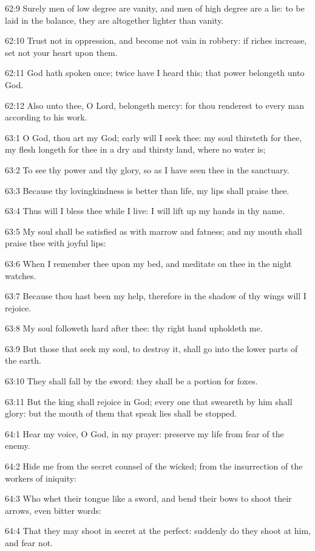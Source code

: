 62:9 Surely men of low degree are vanity, and men of high degree are a lie: to be laid in the balance, they are altogether lighter than vanity.

62:10 Trust not in oppression, and become not vain in robbery: if riches increase, set not your heart upon them.

62:11 God hath spoken once; twice have I heard this; that power belongeth unto God.

62:12 Also unto thee, O Lord, belongeth mercy: for thou renderest to every man according to his work.



63:1 O God, thou art my God; early will I seek thee: my soul thirsteth for thee, my flesh longeth for thee in a dry and thirsty land, where no water is;

63:2 To see thy power and thy glory, so as I have seen thee in the sanctuary.

63:3 Because thy lovingkindness is better than life, my lips shall praise thee.

63:4 Thus will I bless thee while I live: I will lift up my hands in thy name.

63:5 My soul shall be satisfied as with marrow and fatness; and my mouth shall praise thee with joyful lips:

63:6 When I remember thee upon my bed, and meditate on thee in the night watches.

63:7 Because thou hast been my help, therefore in the shadow of thy wings will I rejoice.

63:8 My soul followeth hard after thee: thy right hand upholdeth me.

63:9 But those that seek my soul, to destroy it, shall go into the lower parts of the earth.

63:10 They shall fall by the sword: they shall be a portion for foxes.

63:11 But the king shall rejoice in God; every one that sweareth by him shall glory: but the mouth of them that speak lies shall be stopped.



64:1 Hear my voice, O God, in my prayer: preserve my life from fear of the enemy.

64:2 Hide me from the secret counsel of the wicked; from the insurrection of the workers of iniquity:

64:3 Who whet their tongue like a sword, and bend their bows to shoot their arrows, even bitter words:

64:4 That they may shoot in secret at the perfect: suddenly do they shoot at him, and fear not.

